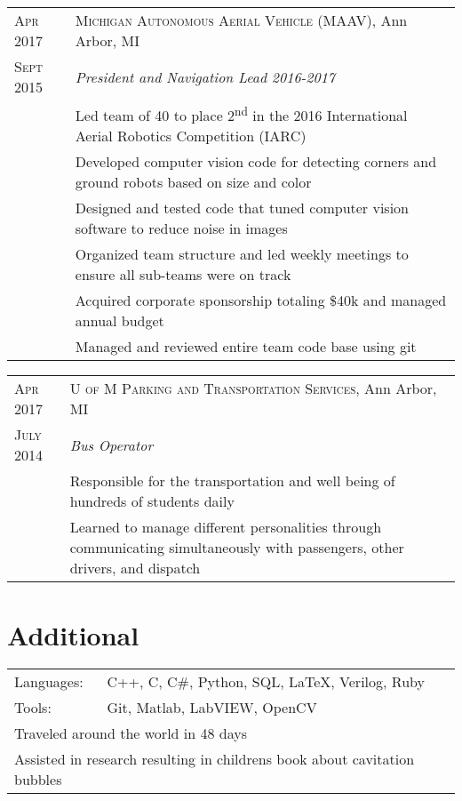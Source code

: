 \documentclass[a4paper,12pt]{article} %
\begin{document}

\begin{tabular}{R{2.1cm}|p{15.5cm}}
\textsc{Apr 2017} & \textsc{Michigan Autonomous Aerial Vehicle (MAAV)}, Ann Arbor, MI\\
\textsc{Sept 2015} & \emph{President and Navigation Lead 2016-2017} \\
& \footnotesize{Led team of 40 to place 2\textsuperscript{nd} in the 2016
  International Aerial Robotics Competition (IARC)} \\
& \footnotesize{Developed computer vision code for detecting corners and
  ground robots based on size and color} \\
& \footnotesize{Designed and tested code that tuned computer vision software to
  reduce noise in images} \\
& \footnotesize{Organized team structure and led weekly meetings to ensure all
  sub-teams were on track} \\
& \footnotesize{Acquired corporate sponsorship totaling \$40k and managed annual
  budget} \\
& \footnotesize{Managed and reviewed entire team code base using git} \\
\end{tabular}


\begin{tabular}{R{2.1cm}|p{15.5cm}}
\textsc{Apr 2017} & \textsc{U of M Parking and Transportation Services}, Ann Arbor, MI\\
\textsc{July 2014} & \emph{Bus Operator} \\
& \footnotesize{Responsible for the transportation and well being of hundreds
  of students daily} \\
& \footnotesize{Learned to manage different personalities through communicating
  simultaneously with passengers, other drivers, and dispatch} \\
\end{tabular}


\section{Additional}

\begin{tabular}{ll}
Languages: & C++, C, C\#, Python, SQL, \LaTeX, Verilog, Ruby \\
Tools: & Git, Matlab, LabVIEW, OpenCV \\
\multicolumn{2}{l}{Traveled around the world in 48 days}\\
\multicolumn{2}{l}{Assisted in research resulting in childrens book about
  cavitation bubbles}\\
\end{tabular}

\clearpage %
\end{document}
